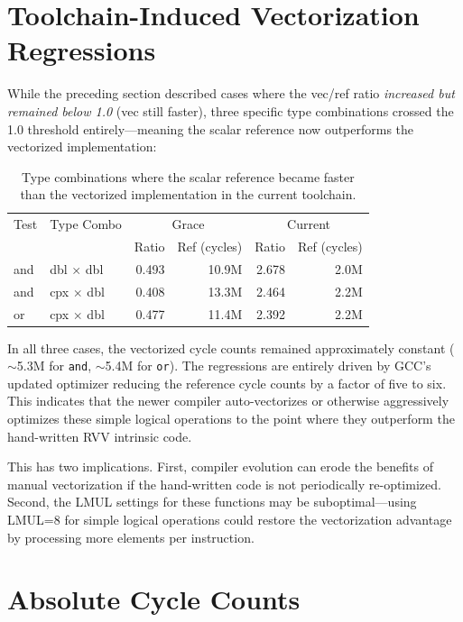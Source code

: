 \section{Toolchain-Induced Vectorization Regressions}

While the preceding section described cases where the vec/ref ratio \emph{increased but remained below 1.0} (vec still faster), three specific type combinations crossed the 1.0 threshold entirely---meaning the scalar reference now outperforms the vectorized implementation:

\begin{table}[H]
\centering
\caption{Type combinations where the scalar reference became faster than the vectorized implementation in the current toolchain.}
\label{tab:regressions}
\small
\begin{tabular}{l l r r r r}
\toprule
Test & Type Combo & \multicolumn{2}{c}{Grace} & \multicolumn{2}{c}{Current} \\
 & & Ratio & Ref (cycles) & Ratio & Ref (cycles) \\
\midrule
and & dbl $\times$ dbl & 0.493 & 10.9M & 2.678 & 2.0M \\
and & cpx $\times$ dbl & 0.408 & 13.3M & 2.464 & 2.2M \\
or & cpx $\times$ dbl & 0.477 & 11.4M & 2.392 & 2.2M \\
\bottomrule
\end{tabular}
\end{table}

In all three cases, the vectorized cycle counts remained approximately constant ($\sim$5.3M for \texttt{and}, $\sim$5.4M for \texttt{or}). The regressions are entirely driven by GCC's updated optimizer reducing the reference cycle counts by a factor of five to six. This indicates that the newer compiler auto-vectorizes or otherwise aggressively optimizes these simple logical operations to the point where they outperform the hand-written RVV intrinsic code.

This has two implications. First, compiler evolution can erode the benefits of manual vectorization if the hand-written code is not periodically re-optimized. Second, the LMUL settings for these functions may be suboptimal---using LMUL=8 for simple logical operations could restore the vectorization advantage by processing more elements per instruction.

\section{Absolute Cycle Counts}

